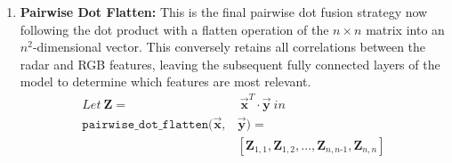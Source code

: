 \documentclass{mpaper}
\begin{document}
\begin{enumerate}
    \item \textbf{Pairwise Dot Flatten:} This is the final pairwise dot fusion strategy now following the dot product with a flatten operation of the $n \times n$ matrix into an $n^2$-dimensional vector. This conversely retains all correlations between the radar and RGB features, leaving the subsequent fully connected layers of the model to determine which features are most relevant.
    \begin{align*}
        \mathit{Let} \ \bm{Z} = & \ \bm{\vec{x}}^T \cdot \bm{\vec{y}} \ \mathit{in} \\
        \mathtt{pairwise\_dot\_flatten}(\bm{\vec{x}}, &\bm{\vec{y}}) =\\ &\left[ \bm{Z}_{1,1}, \bm{Z}_{1,2}, \ldots, \bm{Z}_{n,n\text{-}1}, \bm{Z}_{n,n} \right]
    \end{align*}
    

\end{enumerate}
\end{document}

